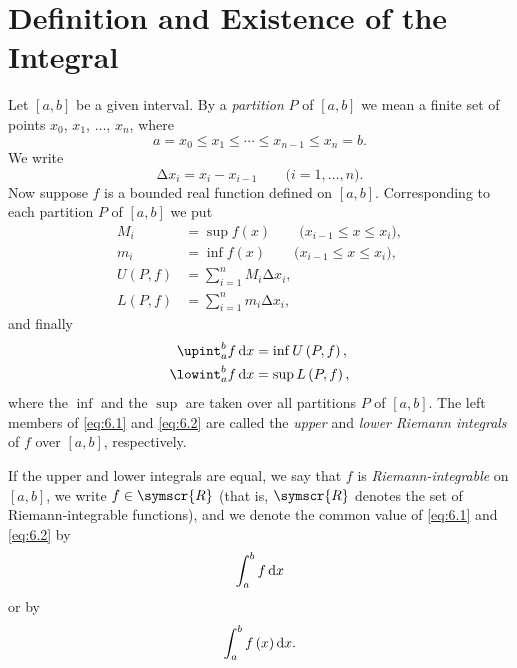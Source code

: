 \section{Definition and Existence of the Integral}

\begin{definition}\label{definition:6.1}
    Let \(\left[a,b\right]\) be a given interval. By a \emph{partition} \(P\) of \(\left[a,b\right]\) we mean a finite set of points \(x_0\), \(x_1\), \(\ldots\), \(x_n\), where
    \begin{equation*}
        a=x_0\leqslant x_1\leqslant\cdots\leqslant x_{n-1}\leqslant x_n=b.
    \end{equation*}
    We write
    \begin{equation*}
        \increment x_i=x_i-x_{i-1}\qquad\text{(\(i=1,\ldots,n\))}.
    \end{equation*}
    Now suppose \(f\) is a bounded real function defined on \(\left[a,b\right]\). Corresponding to each partition \(P\) of \(\left[a,b\right]\) we put
    \begin{align*}
        M_i&=\sup f\left(x\right)\qquad\text{(\(x_{i-1}\leqslant x\leqslant x_i\))},\\
        m_i&=\inf f\left(x\right)\qquad\text{(\(x_{i-1}\leqslant x\leqslant x_i\))},\\
        U\left(P,f\right)&=\sum_{i=1}^nM_i\increment x_i,\\
        L\left(P,f\right)&=\sum_{i=1}^nm_i\increment x_i,
    \end{align*}
    and finally
    \begin{align}
        \upint_a^bf\odif{x}&=\inf U\left(P,f\right),\label{eq:6.1}\\
        \lowint_a^bf\odif{x}&=\sup L\left(P,f\right),\label{eq:6.2}
    \end{align}
    where the \(\inf\) and the \(\sup\) are taken over all partitions \(P\) of \(\left[a,b\right]\). The left members of \eqref{eq:6.1} and \eqref{eq:6.2} are called the \emph{upper} and \emph{lower Riemann integrals} of \(f\) over \(\left[a,b\right]\), respectively.

    If the upper and lower integrals are equal, we say that \(f\) is \emph{Riemann-integrable} on \(\left[a,b\right]\), we write \(f\in\symscr{R}\) (that is, \(\symscr{R}\) denotes the set of Riemann-integrable functions), and we denote the common value of \eqref{eq:6.1} and \eqref{eq:6.2} by
    \begin{equation}
        \int_a^bf\odif{x}
    \end{equation}
    or by
    \begin{equation}
        \int_a^bf\left(x\right)\odif{x}.
    \end{equation}


\end{definition}
